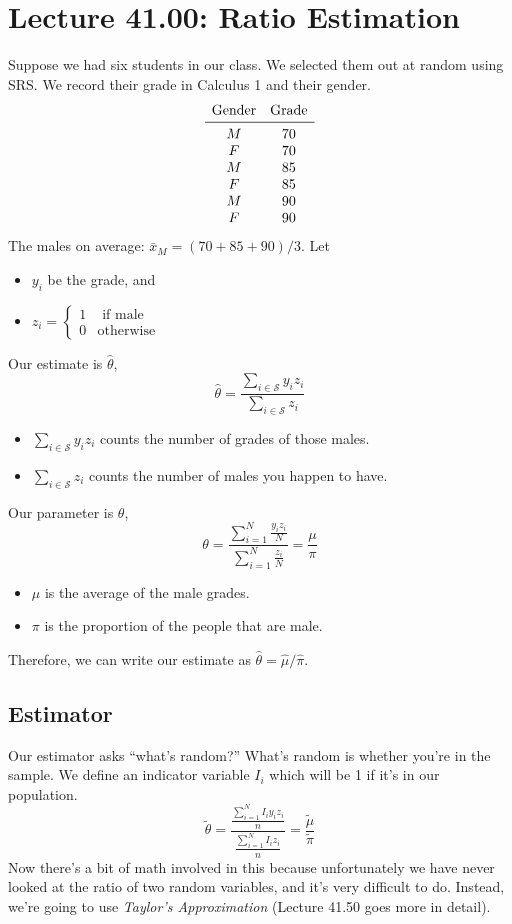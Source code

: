 \section{Lecture 41.00: Ratio Estimation}
Suppose we had six students in our class. We selected them out at random
using SRS\@. We record their grade in Calculus 1 and their gender.
\[ \begin{matrix}
        \text{Gender} & \text{Grade} \\
        \midrule
        M             & 70           \\
        F             & 70           \\
        M             & 85           \\
        F             & 85           \\
        M             & 90           \\
        F             & 90
    \end{matrix} \]
The males on average: $ \bar{x}_M=(70+85+90)/3 $.
Let
\begin{itemize}
    \item $ y_i $ be the grade, and
    \item $ z_i=\begin{cases}
                  1 & \text{ if male}  \\
                  0 & \text{otherwise}
              \end{cases} $
\end{itemize}
Our estimate is $ \hat{\theta} $,
\[ \hat{\theta}=\frac{\sum_{i\in\mathcal{S}}y_i z_i}{\sum_{i\in \mathcal{S}}z_i }  \]
\begin{itemize}
    \item $ \sum_{i\in\mathcal{S}}y_i z_i $ counts the number of grades of those males.
    \item $ \sum_{i\in\mathcal{S}} z_i $ counts the number of males you happen to have.
\end{itemize}
Our parameter is $ \theta $,
\[ \theta=\frac{\sum_{i=1}^{N} \frac{y_i z_i}{N} }{\sum_{i=1}^{N} \frac{z_i}{N} }=\frac{\mu}{\pi}   \]
\begin{itemize}
    \item $ \mu $ is the average of the male grades.
    \item $ \pi $ is the proportion of the people that are male.
\end{itemize}
Therefore, we can write our estimate as $ \hat{\theta}=\hat{\mu}/\hat{\pi} $.
\subsection*{Estimator}
Our estimator asks ``what's random?''
What's random is whether you're in the sample.
We define an indicator variable $ I_i $ which will be 1 if it's in our population.
\[ \tilde{\theta}=\frac{\frac{\sum_{i=1}^{N}I_i y_i z_i}{n} }{\frac{\sum_{i=1}^{N} I_i z_i}{n}}=\frac{\tilde{\mu}}{\tilde{\pi}}   \]
Now there's a bit of math involved in this because unfortunately we have never
looked at the ratio of two random variables, and it's very difficult to do.
Instead, we're going to use \emph{Taylor's Approximation} (Lecture 41.50 goes more in detail).

